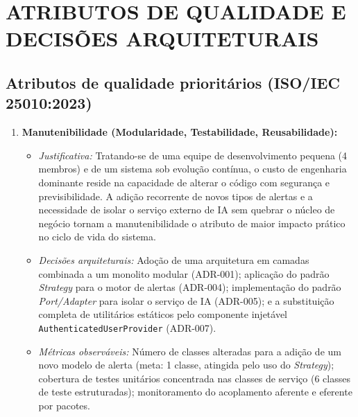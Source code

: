 \documentclass[12pt,a4paper]{article}
\begin{document}
\newpage
\section{ATRIBUTOS DE QUALIDADE E DECISÕES ARQUITETURAIS}

\subsection{Atributos de qualidade prioritários (ISO/IEC 25010:2023)}

\begin{enumerate}
    \item \textbf{Manutenibilidade (Modularidade, Testabilidade, Reusabilidade):}
    \begin{itemize}
        \item \textit{Justificativa:} Tratando-se de uma equipe de desenvolvimento pequena (4 membros) e de um sistema sob evolução contínua, o custo de engenharia dominante reside na capacidade de alterar o código com segurança e previsibilidade. A adição recorrente de novos tipos de alertas e a necessidade de isolar o serviço externo de IA sem quebrar o núcleo de negócio tornam a manutenibilidade o atributo de maior impacto prático no ciclo de vida do sistema.
        \item \textit{Decisões arquiteturais:} Adoção de uma arquitetura em camadas combinada a um monolito modular (ADR-001); aplicação do padrão \textit{Strategy} para o motor de alertas (ADR-004); implementação do padrão \textit{Port/Adapter} para isolar o serviço de IA (ADR-005); e a substituição completa de utilitários estáticos pelo componente injetável \texttt{AuthenticatedUserProvider} (ADR-007).
        \item \textit{Métricas observáveis:} Número de classes alteradas para a adição de um novo modelo de alerta (meta: 1 classe, atingida pelo uso do \textit{Strategy}); cobertura de testes unitários concentrada nas classes de serviço (6 classes de teste estruturadas); monitoramento do acoplamento aferente e eferente por pacotes.
    \end{itemize}


\end{enumerate}
\end{document}
